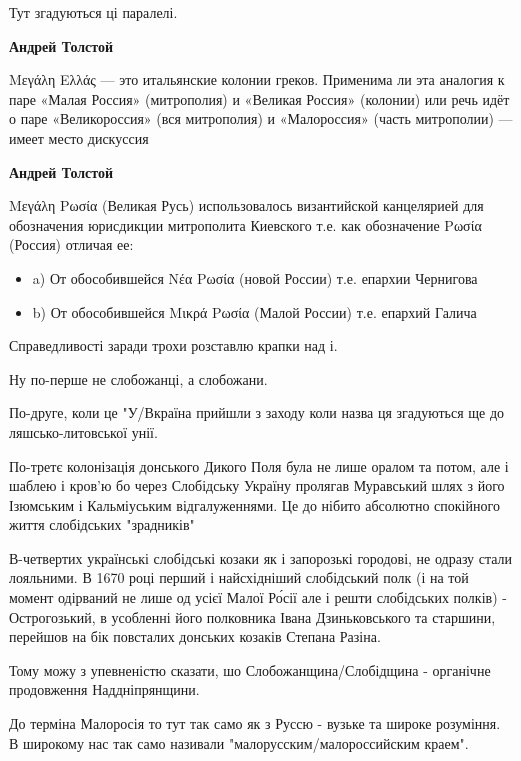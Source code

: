 \begin{itemize}
\begin{itemize}
Тут згадуються ці паралелі.

\textbf{Андрей Толстой} 

Μεγάλη Ελλάς — это итальянские колонии греков. Применима ли эта аналогия к паре
«Малая Россия» (митрополия) и «Великая Россия» (колонии) или речь идёт о паре
«Великороссия» (вся митрополия) и «Малороссия» (часть митрополии) — имеет место
дискуссия

\textbf{Андрей Толстой} 

Μεγάλη Ρωσία (Великая Русь) использовалось византийской канцелярией для
обозначения юрисдикции митрополита Киевского т.е. как обозначение Ρωσία
(Россия) отличая ее:

\begin{itemize}
  \item a) От обособившейся Νέα Ρωσία (новой России) т.е. епархии Чернигова
  \item b) От обособившейся Μικρά Ρωσία (Малой России) т.е. епархий Галича
\end{itemize}

\end{itemize} %


Справедливості заради трохи розставлю крапки над і.

Ну по-перше не слобожанці, а слобожани.

По-друге, коли це "У/Вкраїна прийшли з заходу коли назва ця згадуються ще до
ляшсько-литовської унії.

По-третє колонізація донського Дикого Поля була не лише оралом та потом, але і
шаблею і кров'ю бо через Слобідську Україну пролягав Муравський шлях з його
Ізюмським і Кальміуським відгалуженнями. Це до нібито абсолютно спокійного
життя слобідських "зрадників"

В-четвертих українські слобідські козаки як і запорозькі городові, не одразу
стали лояльними. В 1670 році перший і найсхідніший слобідський полк (і на той
момент одірваний не лише од усієї Малої Ро́сії але і решти слобідських полків) -
Острогозький, в усобленні його полковника Івана Дзиньковського та старшини,
перейшов на бік повсталих донських козаків Степана Разіна.

Тому можу з упевненістю сказати, шо Слобожанщина/Слобідщина - органічне
продовження Наддніпрянщини.

До терміна Малоросія то тут так само як з Руссю - вузьке та широке розуміння. В
широкому нас так само називали "малорусским/малороссийским краем".


\end{itemize}
